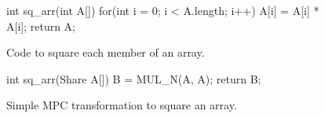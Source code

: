 \begin{figure}[h]
\centering
\begin{minipage}{0.7\textwidth}
\begin{javacode}
int sq_arr(int A[]) {
    for(int i = 0; i < A.length; i++) {
        A[i] = A[i] * A[i];
    }
    return A;
}
\end{javacode}
\end{minipage}
\caption{Code to square each member of an array.}
\label{fig:squarearray}
\end{figure}

\begin{figure}[h]
\centering
\begin{minipage}{0.7\textwidth}
\begin{javacode}
int sq_arr(Share A[]) {
    B = MUL_N(A, A);
    return B;
}
\end{javacode}
\end{minipage}
\caption{Simple MPC transformation to square an array.}
\label{fig:squarearraympc}
\end{figure}



